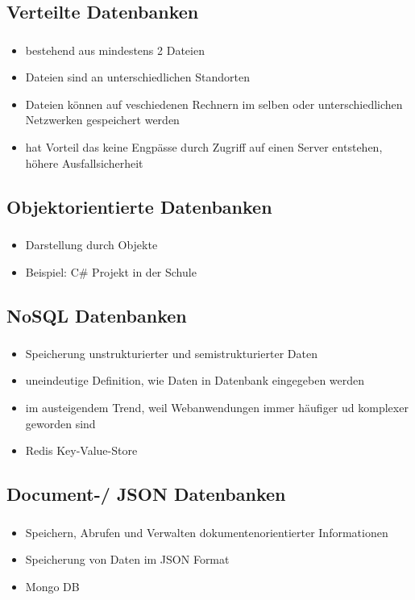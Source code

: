 \documentclass[aspectratio=169,14pt,xcolor=dvipsnames]{beamer}
\begin{document}
\subsection{Verteilte Datenbanken}
\begin{frame}[t]
    \frametitle{\subsecname}
    \begin{itemize}
        \item bestehend aus mindestens 2 Dateien
        \item Dateien sind an unterschiedlichen Standorten
        \item Dateien können auf veschiedenen Rechnern im selben oder unterschiedlichen Netzwerken gespeichert werden
        \item hat Vorteil das keine Engpässe durch Zugriff auf einen Server entstehen, höhere Ausfallsicherheit
    \end{itemize}
\end{frame}

\subsection{Objektorientierte Datenbanken}
\begin{frame}[t]
    \frametitle{\subsecname}
    \begin{itemize}
        \item Darstellung durch Objekte
        \item Beispiel: C\# Projekt in der Schule 
    \end{itemize}
\end{frame}

\subsection{NoSQL Datenbanken}
\begin{frame}[t]
    \frametitle{\subsecname}
    \begin{itemize}
        \item Speicherung unstrukturierter und semistrukturierter Daten
        \item uneindeutige Definition, wie Daten in Datenbank eingegeben werden
        \item im austeigendem Trend, weil Webanwendungen immer häufiger ud komplexer geworden sind
        \item Redis Key-Value-Store
    \end{itemize}
\end{frame}

\subsection{Document-/ JSON Datenbanken}
\begin{frame}[t]
    \frametitle{\subsecname}
    \begin{itemize}
        \item Speichern, Abrufen und Verwalten dokumentenorientierter Informationen
        \item Speicherung von Daten im JSON Format
        \item Mongo DB
    \end{itemize}
\end{frame}
\end{document}
